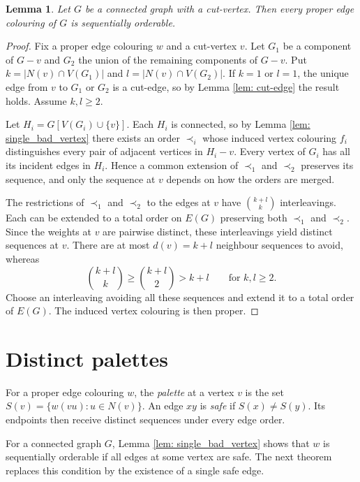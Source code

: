 \documentclass[a4paper,12pt]{elsarticle}
\newtheorem{lemma}[theorem]{Lemma}
\begin{document}
\begin{lemma} Let $G$ be a connected graph with a cut-vertex. Then every proper edge colouring of $G$ is sequentially orderable. \label{lem: cut-vertex}
\end{lemma}
\begin{proof}
    Fix a proper edge colouring $w$ and a cut-vertex $v$. Let $G_1$ be a component of $G-v$ and $G_2$ the union of the remaining components of $G-v$. Put $k=|N(v)\cap V(G_1)|$ and $l=|N(v)\cap V(G_2)|$. If $k=1$ or $l=1$, the unique edge from $v$ to $G_1$ or $G_2$ is a cut-edge, so by Lemma \ref{lem: cut-edge} the result holds. Assume $k,l\geq 2$.

    Let $H_i=G[V(G_i)\cup\{v\}]$. Each $H_i$ is connected, so by Lemma \ref{lem: single_bad_vertex} there exists an order $\prec_i$ whose induced vertex colouring $f_i$ distinguishes every pair of adjacent vertices in $H_i-v$. Every vertex of $G_i$ has all its incident edges in $H_i$. Hence a common extension of $\prec_1$ and $\prec_2$ preserves its sequence, and only the sequence at $v$ depends on how the orders are merged.

    The restrictions of $\prec_1$ and $\prec_2$ to the edges at $v$ have $\binom{k+l}{k}$ interleavings. Each can be extended to a total order on $E(G)$ preserving both $\prec_1$ and $\prec_2$. Since the weights at $v$ are pairwise distinct, these interleavings yield distinct sequences at $v$. There are at most $d(v)=k+l$ neighbour sequences to avoid, whereas
    \[
        \binom{k+l}{k}\geq\binom{k+l}{2}>k+l
        \qquad\text{for }k,l\geq2.
    \]
    Choose an interleaving avoiding all these sequences and extend it to a total order of $E(G)$. The induced vertex colouring is then proper.
\end{proof}

\section{Distinct palettes}

For a proper edge colouring $w$, the \emph{palette} at a vertex $v$ is the set $S(v)=\{w(vu):u\in N(v)\}$. An edge $xy$ is \emph{safe} if $S(x)\neq S(y)$. Its endpoints then receive distinct sequences under every edge order.

For a connected graph $G$, Lemma \ref{lem: single_bad_vertex} shows that $w$ is sequentially orderable if all edges at some vertex are safe. The next theorem replaces this condition by the existence of a single safe edge.
\end{document}
